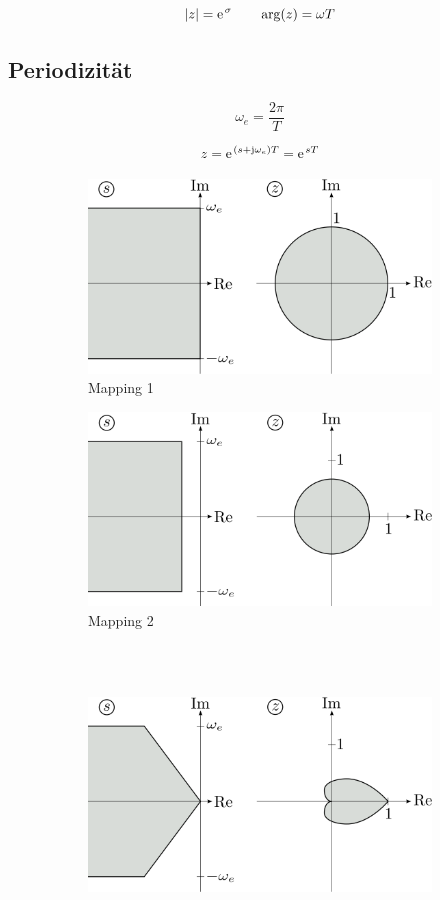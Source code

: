 \[
	|z| = \mathrm{e\;\!}^\sigma \qquad \arg(z) = \omega T
\]

\subsection{Periodizität}
\[
	\omega_e = \frac{2\pi}{T}
\]

\[
	z = \mathrm{e\;\!}^{(s+\mathrm{j}\omega_e)T} = \mathrm{e\;\!}^{sT}
\]

\begin{figure}[th]
	\begin{subfigure}[b]{0.45\textwidth}
		\includegraphics[width=\textwidth]{./images/mapping1}
		\caption{Mapping 1}
	\end{subfigure}
	\hfill
	\begin{subfigure}[b]{0.45\textwidth}
		\includegraphics[width=\textwidth]{./images/mapping2}
		\caption{Mapping 2}
	\end{subfigure}
	\\\\
	\begin{subfigure}[b]{0.45\textwidth}
		\includegraphics[width=\textwidth]{./images/mapping3}

\end{subfigure}
\end{figure}
